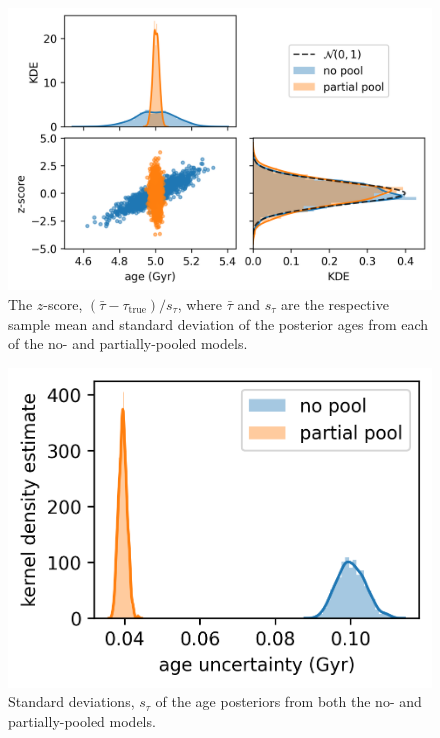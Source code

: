 \begin{figure}[t]
    \centering
    \includegraphics[]{introduction/images/age_z_score.png}
    \caption{The $z$-score, $(\bar{\tau} - \tau_\mathrm{true}) / s_\tau$, where $\bar{\tau}$ and $s_\tau$ are the respective sample mean and standard deviation of the posterior ages from each of the no- and partially-pooled models.}
    \label{fig:zscore}
\end{figure}

\begin{figure}[t]
    \centering
    \includegraphics[]{introduction/images/age_uncertainties.png}
    \caption{Standard deviations, $s_\tau$ of the age posteriors from both the no- and partially-pooled models.}
    \label{fig:age_unc}
\end{figure}

